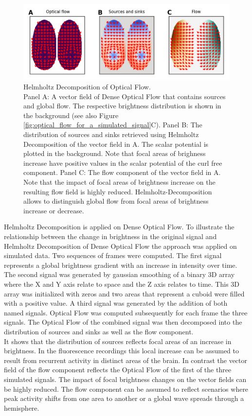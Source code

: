 \begin{figure}[!htb]
\centering
\includegraphics[width=\textwidth,height=\textheight,keepaspectratio]{Figures/helmholtz_decomposition_of_optical_flow_simulation}
\decoRule
\caption[Helmholtz Decomposition of Optical Flow]{Helmholtz Decomposition of Optical Flow.\\ Panel A: A vector field of Dense Optical Flow that contains sources and global flow. The respective brightness distribution is shown in the background (see also Figure \ref{fig:optical_flow_for_a_simulated_signal}C). Panel B: The distribution of sources and sinks retrieved using Helmholtz Decomposition of the vector field in A. The scalar potential is plotted in the background. Note that focal areas of brighness increase have positive values in the scalar potential of the curl free component. Panel C: The flow component of the vector field in A. Note that the impact of focal areas of brightness increase on the resulting flow field is highly reduced. Helmholtz-Decomposition allows to distinguish global flow from focal areas of brightness increase or decrease.}
\label{fig:helmholtz_decomposition_of_optical_flow_simulation}
\end{figure}
Helmholtz Decomposition is applied on Dense Optical Flow. To illustrate the relationship between the change in brightness in the original signal and Helmholtz Decomposition of Dense Optical Flow the approach was applied on simulated data. Two sequences of frames were computed. The first signal represents a global brightness gradient with an increase in intensity over time. The second signal was generated by gaussian smoothing of a binary 3D array where the X and Y axis relate to space and the Z axis relates to time. This 3D array was initialized with zeros and two areas that represent a cuboid were filled with a positive value. A third signal was generated by the addition of both named signals. Optical Flow was computed subsequently for each frame the three signals. The Optical Flow of the combined signal was then decomposed into the distribution of sources and sinks as well as the flow component.\\
It shows that the distribution of sources reflects focal areas of an increase in brightness. In the fluorescence recordings this local increase can be assumed to result from recurrent activity in distinct areas of the brain. In contrast the vector field of the flow component reflects the Optical Flow of the first of the three simulated signals. The impact of focal brightness changes on the vector fields can be highly reduced. The flow component can be assumed to reflect scenarios where peak activity shifts from one area to another or a global wave spreads through a hemisphere.

